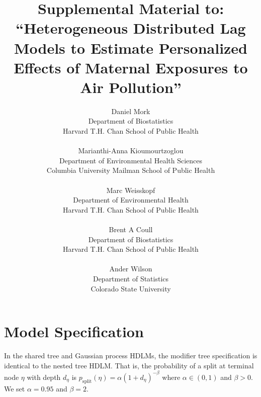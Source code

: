 \documentclass[12pt]{article}
\begin{document}
\title{Supplemental Material to:\\
``Heterogeneous Distributed Lag Models to Estimate Personalized Effects of Maternal Exposures to Air Pollution''}
\author{Daniel Mork\\ 
Department of Biostatistics\\ Harvard T.H. Chan School of Public Health\\\\

Marianthi-Anna Kioumourtzoglou\\
Department of Environmental Health Sciences\\
Columbia University Mailman School of Public Health\\\\

Marc Weisskopf\\
Department of Environmental Health\\ 
Harvard T.H. Chan School of Public Health\\\\ 

Brent A Coull\\
Department of Biostatistics\\
Harvard T.H. Chan School of Public Health\\\\ 

Ander Wilson\\ 
Department of Statistics\\ Colorado State University}
\date{}

\maketitle
\clearpage
{}


\section{Model Specification} \label{sec:mod-spec}
In the shared tree and Gaussian process HDLMs, the modifier tree specification is identical to the nested tree HDLM. That is, the probability of a split at terminal node $\eta$ with depth $d_\eta$ is $p_{\text{split}}(\eta)=\alpha(1+d_\eta)^{-\beta}$ where $\alpha\in(0,1)$ and $\beta>0$. We set $\alpha=0.95$ and $\beta=2$.
\end{document}
